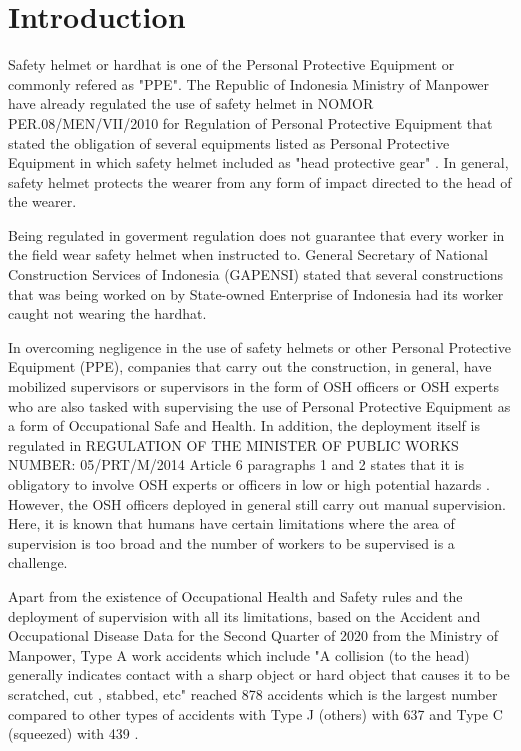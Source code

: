 \section{Introduction}
\label{sec:introduction}


\par Safety helmet or hardhat is one of the Personal Protective Equipment or commonly refered as "PPE".
 The Republic of Indonesia Ministry of Manpower have already regulated the use of safety helmet
 in NOMOR PER.08/MEN/VII/2010 for Regulation of Personal Protective Equipment that stated the obligation
 of several equipments listed as Personal Protective Equipment in which safety helmet included as "head protective gear" \cite{kementrianpekerjaanumum}.
 In general, safety helmet protects the wearer from any form of impact directed to the head of the wearer.

 \par Being regulated in goverment regulation does not guarantee that every worker
 in the field wear safety helmet when instructed to. General Secretary of National Construction Services of Indonesia
 (GAPENSI) stated that several constructions that was being worked on by State-owned Enterprise of Indonesia
 had its worker caught not wearing the hardhat. 

 \par In overcoming negligence in the use of safety helmets or other 
 Personal Protective Equipment (PPE), companies that carry out the construction, in general, have mobilized 
 supervisors or supervisors in the form of OSH officers or OSH experts 
 who are also tasked with supervising the use of Personal Protective Equipment
 as a form of Occupational Safe and Health. 
 In addition, the deployment itself is regulated in REGULATION OF THE 
 MINISTER OF PUBLIC WORKS NUMBER: 05/PRT/M/2014 Article 6 paragraphs 
 1 and 2 states that it is obligatory to involve OSH experts or 
 officers in low or high potential hazards \cite{suratkementriantenagakerja}. However, 
 the OSH officers deployed in general still carry out manual 
 supervision. Here, it is known that humans have certain 
 limitations where the area of supervision is too broad and the 
 number of workers to be supervised is a challenge.

 \par Apart from the existence of Occupational Health and Safety rules and the deployment 
 of supervision with all its limitations, based on the Accident 
 and Occupational Disease Data for the Second Quarter of 2020 
 from the Ministry of Manpower, Type A work accidents which 
 include "A collision (to the head) generally indicates 
 contact with a sharp object or hard object that causes 
 it to be scratched, cut , stabbed, etc" reached 878 accidents 
 which is the largest number compared to other types of 
 accidents with Type J (others) with 637 and Type C (squeezed) 
 with 439 \cite{satudata_kecelakaan_kerja}.